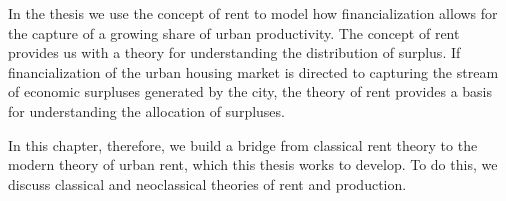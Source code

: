 In the thesis we use the concept of rent to model how financialization allows for the capture  of a growing share of urban productivity. %
The concept of rent provides us with a theory for understanding the distribution of surplus.  If financialization of the urban housing market is directed to capturing the stream of economic surpluses generated by the city, %
the theory of rent provides a basis for understanding the allocation of surpluses.


In this chapter, therefore, we build a bridge from \gls{classical rent theory} to the modern theory of urban rent, which this thesis works to develop. To do this, %
we discuss classical and neoclassical theories of rent and production. 






%




 



